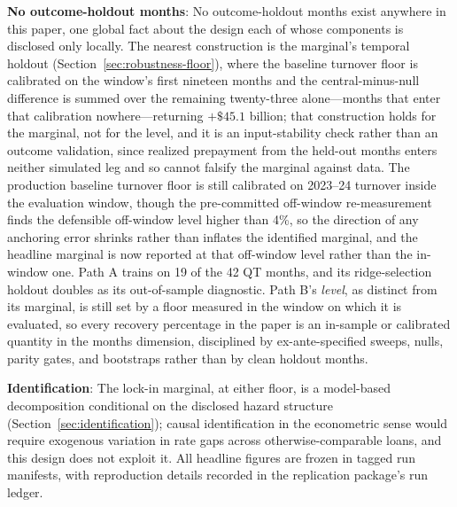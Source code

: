 \textbf{No outcome-holdout months}: No outcome-holdout months exist anywhere in this paper, one global fact about the design each of whose components is disclosed only locally. The nearest construction is the marginal's temporal holdout (Section~\ref{sec:robustness-floor}), where the baseline turnover floor is calibrated on the window's first nineteen months and the central-minus-null difference is summed over the remaining twenty-three alone---months that enter that calibration nowhere---returning $+\$45.1$ billion; that construction holds for the marginal, not for the level, and it is an input-stability check rather than an outcome validation, since realized prepayment from the held-out months enters neither simulated leg and so cannot falsify the marginal against data. The production baseline turnover floor is still calibrated on 2023--24 turnover inside the evaluation window, though the pre-committed off-window re-measurement finds the defensible off-window level higher than 4\%, so the direction of any anchoring error shrinks rather than inflates the identified marginal, and the headline marginal is now reported at that off-window level rather than the in-window one. Path A trains on 19 of the 42 QT months, and its ridge-selection holdout doubles as its out-of-sample diagnostic. Path B's \emph{level}, as distinct from its marginal, is still set by a floor measured in the window on which it is evaluated, so every recovery percentage in the paper is an in-sample or calibrated quantity in the months dimension, disciplined by ex-ante-specified sweeps, nulls, parity gates, and bootstraps rather than by clean holdout months.

\textbf{Identification}: The lock-in marginal, at either floor, is a model-based decomposition conditional on the disclosed hazard structure (Section~\ref{sec:identification}); causal identification in the econometric sense would require exogenous variation in rate gaps across otherwise-comparable loans, and this design does not exploit it. All headline figures are frozen in tagged run manifests, with reproduction details recorded in the replication package's run ledger.

